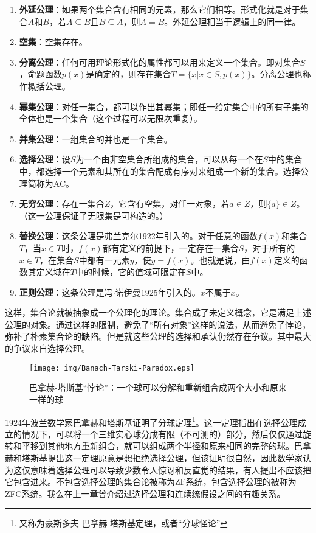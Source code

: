 \documentclass{article}
\begin{document}
\begin{enumerate}
\item \textbf{外延公理}：如果两个集合含有相同的元素，那么它们相等。形式化就是对于集合$A$和$B$，若$A \subseteq B$且$B \subseteq A$，则$A = B$。外延公理相当于逻辑上的同一律。
\item \textbf{空集}：空集存在。
\item \textbf{分离公理}：任何可用理论形式化的属性都可以用来定义一个集合。即对集合$S$，命题函数$p(x)$是确定的，则存在集合$T = \{ x | x \in S, p(x)\}$。分离公理也称作概括公理。
\item \textbf{幂集公理}：对任一集合，都可以作出其幂集；即任一给定集合中的所有子集的全体也是一个集合（这个过程可以无限次重复）。
\item \textbf{并集公理}：一组集合的并也是一个集合。
\item \textbf{选择公理}：设$S$为一个由非空集合所组成的集合，可以从每一个在$S$中的集合中，都选择一个元素和其所在的集合配成有序对来组成一个新的集合。选择公理简称为AC。
\item \textbf{无穷公理}：存在一集合$Z$，它含有空集，对任一对象，若$a \in Z$，则$\{a\} \in Z$。（这一公理保证了无限集是可构造的。）
\item \textbf{替换公理}：这条公理是弗兰克尔1922年引入的。对于任意的函数$f(x)$和集合$T$，当$x \in T$时，$f(x)$都有定义的前提下，一定存在一集合$S$，对于所有的$x \in T$，在集合$S$中都有一元素$y$，使$y = f(x)$。也就是说，由$f(x)$定义的函数其定义域在$T$中的时候，它的值域可限定在$S$中。
\item \textbf{正则公理}：这条公理是冯$\cdot$诺伊曼1925年引入的。$x$不属于$x$。
\end{enumerate}

这样，集合论就被抽象成一个公理化的理论。集合成了未定义概念，它是满足上述公理的对象。通过这样的限制，避免了“所有对象”这样的说法，从而避免了悖论，弥补了朴素集合论的缺陷。但是就这些公理的选择和承认仍然存在争议。其中最大的争议来自选择公理。

\begin{figure}[htbp]
 \centering
 \texttt{[image: img/Banach-Tarski-Paradox.eps]}
 \caption{巴拿赫-塔斯基“悖论”：一个球可以分解和重新组合成两个大小和原来一样的球}
 \label{fig:Banach-Tarski-Paradox}
\end{figure}

 
1924年波兰数学家巴拿赫和塔斯基证明了分球定理\footnote{又称为豪斯多夫-巴拿赫-塔斯基定理，或者“分球怪论”}。这一定理指出在选择公理成立的情况下，可以将一个三维实心球分成有限（不可测的）部分，然后仅仅通过旋转和平移到其他地方重新组合，就可以组成两个半径和原来相同的完整的球。巴拿赫和塔斯基提出这一定理原意是想拒绝选择公理，但该证明很自然，因此数学家认为这仅意味着选择公理可以导致少数令人惊讶和反直觉的结果，有人提出不应该把它包含进来。不包含选择公理的集合论被称为ZF系统，包含选择公理的被称为ZFC系统。我么在上一章曾介绍过选择公理和连续统假设之间的有趣关系。
\end{document}
